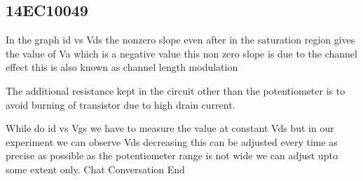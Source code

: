 \documentclass[12pt]{article}
\begin{document}
\subsection*{14EC10049}
 
In the graph id vs Vds the nonzero slope even after in the saturation region gives the value of Va which is a negative value this non zero slope is due to the channel effect this is also known as channel length modulation

The additional resistance kept in the circuit other than the potentiometer is to avoid burning of transistor due to high drain current.

While do id vs Vgs we have to measure the value at constant Vds but in our experiment we can observe Vds decreasing this can be adjusted every time as precise as possible as the potentiometer range is not wide we can adjust upto some extent only.
Chat Conversation End
\end{document}
